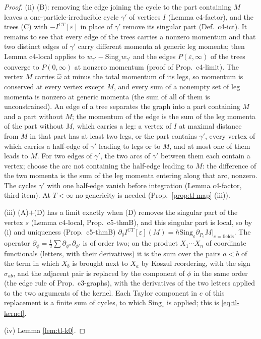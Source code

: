 \documentclass[11pt]{article}
\numberwithin{equation}{section}
\theoremstyle{plain}
\theoremstyle{definition}
\begin{document}
\begin{proof}
(ii) (B): removing the edge joining the cycle to the part containing $M$ leaves a one-particle-irreducible cycle $\gamma'$ of vertices $I$ (Lemma c4-factor), and the trees (C) with $-I^{CT}[\varepsilon]$ in place of $\gamma'$ remove its singular part (Def.~c4-ict). It remains to see that every edge of the trees carries a nonzero momentum and that two distinct edges of $\gamma'$ carry different momenta at generic leg momenta; then Lemma c4-local applies to $w_{\gamma'}-\mathrm{Sing}_\varepsilon w_{\gamma'}$ and the edges $P(\varepsilon,\infty)$ of the trees converge to $P(0,\infty)$ at nonzero momentum (proof of Prop.~c4-limit). The vertex $M$ carries $\hat\omega$ at minus the total momentum of its legs, so momentum is conserved at every vertex except $M$, and every sum of a nonempty set of leg momenta is nonzero at generic momenta (the sum of all of them is unconstrained). An edge of a tree separates the graph into a part containing $M$ and a part without $M$; the momentum of the edge is the sum of the leg momenta of the part without $M$, which carries a leg: a vertex of $I$ at maximal distance from $M$ in that part has at least two legs, or the part contains $\gamma'$, every vertex of which carries a half-edge of $\gamma'$ leading to legs or to $M$, and at most one of them leads to $M$. For two edges of $\gamma'$, the two arcs of $\gamma'$ between them each contain a vertex; choose the arc not containing the half-edge leading to $M$: the difference of the two momenta is the sum of the leg momenta entering along that arc, nonzero. The cycles $\gamma'$ with one half-edge vanish before integration (Lemma c4-factor, third item). At $T<\infty$ no genericity is needed (Prop.~\ref{prop:tl-map} (iii)).

(iii) (A)$+$(D) has a limit exactly when (D) removes the singular part of the vertex $s$ (Lemma c4-local, Prop.~c5-thmB), and this singular part is local, so by (i) and uniqueness (Prop.~c5-thmB) $\partial_\delta I^{CT}[\varepsilon](M)=\hbar\mathrm{Sing}_\varepsilon\partial_{P_e}M|_{e=\text{fields}}$. The operator $\partial_\phi=\tfrac12\sum\partial_{\phi''}\partial_{\phi'}$ is of order two; on the product $X_1\cdots X_n$ of coordinate functionals (letters, with their derivatives) it is the sum over the pairs $a<b$ of the term in which $X_b$ is brought next to $X_a$ by Koszul reordering, with the sign $\sigma_{ab}$, and the adjacent pair is replaced by the component of $\phi$ in the same order (the edge rule of Prop.~c3-graphs), with the derivatives of the two letters applied to the two arguments of the kernel. Each Taylor component in $e$ of this replacement is a finite sum of cycles, to which $\mathrm{Sing}_\varepsilon$ is applied; this is \eqref{eq:tl-kernel}.

(iv) Lemma \ref{lem:tl-k0}.
\end{proof}
\end{document}
